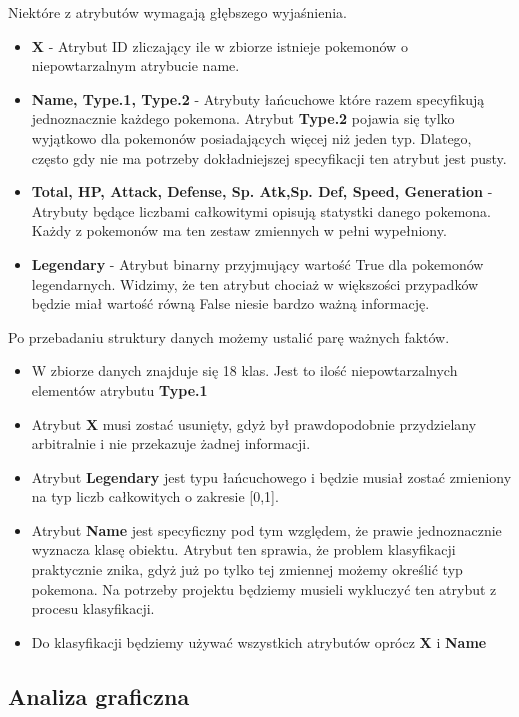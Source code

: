 \documentclass{article}
\begin{document}
Niektóre z atrybutów wymagają głębszego wyjaśnienia.
\begin{itemize}
	\item \textbf{X} - Atrybut ID zliczający ile w zbiorze istnieje pokemonów o niepowtarzalnym atrybucie name.
	\item \textbf{Name, Type.1, Type.2} - Atrybuty łańcuchowe które razem specyfikują jednoznacznie każdego pokemona. Atrybut \textbf{Type.2} pojawia się tylko wyjątkowo dla pokemonów posiadających więcej niż jeden typ. Dlatego, często gdy nie ma potrzeby dokładniejszej specyfikacji ten atrybut jest pusty.
	\item \textbf{Total, HP, Attack, Defense, Sp. Atk,Sp. Def, Speed, Generation} - Atrybuty będące liczbami całkowitymi opisują statystki danego pokemona. Każdy z pokemonów ma ten zestaw zmiennych w pełni wypełniony.
	\item \textbf{Legendary} - Atrybut binarny przyjmujący wartość True dla pokemonów legendarnych. Widzimy, że ten atrybut chociaż w większości przypadków będzie miał wartość równą False niesie bardzo ważną informację.
\end{itemize} 

\clearpage

Po przebadaniu struktury danych możemy ustalić parę ważnych faktów.
\begin{itemize}
	\item W zbiorze danych znajduje się 18 klas. Jest to ilość niepowtarzalnych elementów atrybutu \textbf{Type.1}
	\item Atrybut \textbf{X} musi zostać usunięty, gdyż był prawdopodobnie przydzielany arbitralnie i nie przekazuje żadnej informacji.
	\item Atrybut \textbf{Legendary} jest typu łańcuchowego i będzie musiał zostać zmieniony na typ liczb całkowitych o zakresie [0,1].
	\item Atrybut \textbf{Name} jest specyficzny pod tym względem, że prawie jednoznacznie wyznacza klasę obiektu. Atrybut ten sprawia, że problem klasyfikacji praktycznie znika, gdyż już po tylko tej zmiennej możemy określić typ pokemona. Na potrzeby projektu będziemy musieli wykluczyć ten atrybut z procesu klasyfikacji.
	\item Do klasyfikacji będziemy używać wszystkich atrybutów oprócz \textbf{X} i \textbf{Name}  
\end{itemize}

\subsection{Analiza graficzna}
\end{document}
